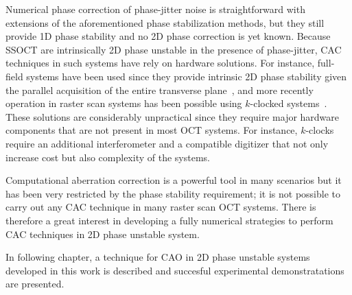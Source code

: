 Numerical phase correction of phase-jitter noise is straightforward with extensions of the aforementioned phase stabilization methods, but they still provide 1D phase stability and no 2D phase correction is yet known. Because SSOCT are intrinsically 2D phase unstable in the presence of phase-jitter, CAC techniques in such systems have rely on hardware solutions. For instance, full-field systems have been used since they provide intrinsic 2D phase stability given the parallel acquisition of the entire transverse plane~\cite{Kumar2013_Subaperture, Hillmann2016_Aberrationfree}, and more recently operation in raster scan systems has been possible using $k$-clocked systems~\cite{Kumar2017_Invivo}. These solutions are considerably unpractical since they require major hardware components that are not present in most OCT systems. For instance, $k$-clocks require an additional interferometer and a compatible digitizer that not only increase cost but also complexity of the systems.

Computational aberration correction is a powerful tool in many scenarios but it has been very restricted by the phase stability requirement; it is not possible to carry out any CAC technique in many raster scan OCT systems. There is therefore a great interest in developing a fully numerical strategies to perform CAC techniques in 2D phase unstable system.

In following chapter, a technique for CAO in 2D phase unstable systems developed in this work is described and succesful experimental demonstratations are presented.